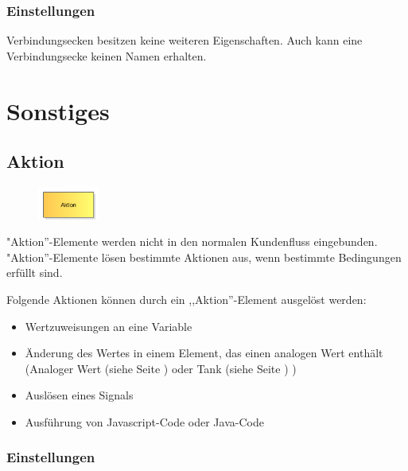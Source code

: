 \subsection*{Einstellungen}

Verbindungsecken besitzen keine weiteren Eigenschaften. Auch kann eine Verbindungsecke keinen Namen erhalten.





\chapter{Sonstiges}

\section{Aktion}
\label{ref:ModelElementAction}

\begin{figure}
\vspace{-22pt}
\includegraphics[width=2cm]{imageModelElementAction.png}
\vspace{-22pt}
\end{figure}

"Aktion''-Elemente werden nicht in den normalen Kundenfluss eingebunden.
"Aktion''-Elemente lösen bestimmte Aktionen aus, wenn bestimmte Bedingungen erfüllt sind.

Folgende Aktionen können durch ein ,,Aktion''-Element ausgelöst werden:

\begin{itemize}
  \item Wertzuweisungen an eine Variable 
  \item Änderung des Wertes in einem Element, das einen analogen Wert enthält
  (Analoger Wert (siehe Seite \pageref{ref:ModelElementAnalogValue}) oder Tank (siehe Seite \pageref{ref:ModelElementTank}) )
  \item Auslösen eines Signals 
  \item Ausführung von Javascript-Code oder Java-Code 
\end{itemize}

\subsection*{Einstellungen}


